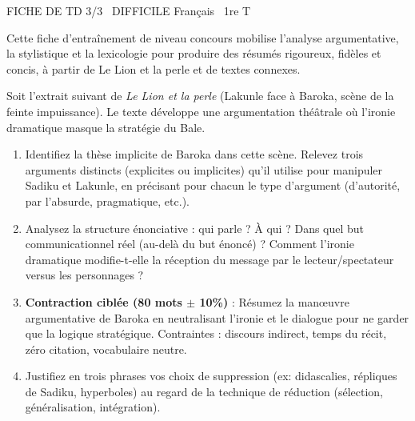 \documentclass[11pt]{article}
\begin{document}
\begin{tcolorbox}[enhanced,colback=popink,colframe=popink,arc=10pt,boxrule=0pt,left=12pt,right=12pt,top=9pt,bottom=9pt]
{\color{white}\popxbold\small FICHE DE TD 3/3 \textbullet\ DIFFICILE \hfill Français \textbullet\ 1re T\par}
\end{tcolorbox}
\vspace{4pt}
\noindent Cette fiche d'entraînement de niveau concours mobilise l'analyse argumentative, la stylistique et la lexicologie pour produire des résumés rigoureux, fidèles et concis, à partir de \og Le Lion et la perle \fg{} et de textes connexes.

\begin{exercice}
Soit l'extrait suivant de \textit{Le Lion et la perle} (Lakunle face à Baroka, scène de la feinte impuissance). Le texte développe une argumentation théâtrale où l'ironie dramatique masque la stratégie du Bale.

\begin{enumerate}
    \item Identifiez la thèse implicite de Baroka dans cette scène. Relevez trois arguments distincts (explicites ou implicites) qu'il utilise pour manipuler Sadiku et Lakunle, en précisant pour chacun le type d'argument (d'autorité, par l'absurde, pragmatique, etc.).
    \item Analysez la structure énonciative : qui parle ? À qui ? Dans quel but communicationnel réel (au-delà du but énoncé) ? Comment l'ironie dramatique modifie-t-elle la réception du message par le lecteur/spectateur versus les personnages ?
    \item \textbf{Contraction ciblée (80 mots $\pm$ 10\%)} : Résumez la manœuvre argumentative de Baroka en neutralisant l'ironie et le dialogue pour ne garder que la logique stratégique. Contraintes : discours indirect, temps du récit, zéro citation, vocabulaire neutre.
    \item Justifiez en trois phrases vos choix de suppression (ex: didascalies, répliques de Sadiku, hyperboles) au regard de la \og technique de réduction \fg{} (sélection, généralisation, intégration).
\end{enumerate}
\end{exercice}
\end{document}
